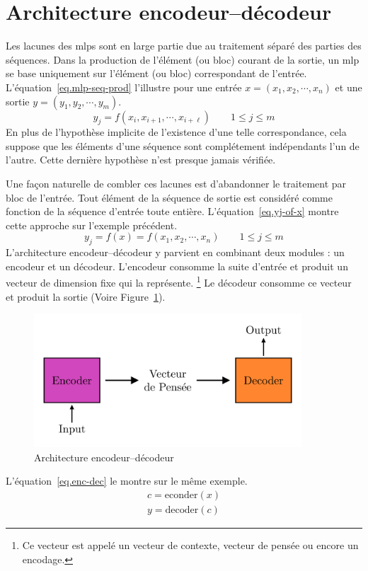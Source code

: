 \section{Architecture encodeur--décodeur}

Les lacunes des \glspl{mlp} sont en large partie due au traitement séparé des parties des séquences.
Dans la production de l'élément (ou bloc) courant de la sortie,
un \gls{mlp} se base uniquement sur l'élément (ou bloc) correspondant de l'entrée.
L'équation~\ref{eq.mlp-seq-prod} l'illustre pour une entrée \(x = (x_1, x_2, \cdots, x_n)\)
et une sortie \(y = (y_1, y_2, \cdots, y_m)\).
\begin{equation}
    \label{eq.mlp-seq-prod}
    y_j = f(x_i, x_{i+1}, \cdots, x_{i+\ell}) \qquad 1 \le j \le m
\end{equation}
En plus de l'hypothèse implicite de l'existence d'une telle correspondance,
cela suppose que les éléments d'une séquence sont complétement indépendants l'un de l'autre.
Cette dernière hypothèse n'est presque jamais vérifiée. 

Une façon naturelle de combler ces lacunes est d'abandonner le traitement par bloc de l'entrée.
Tout élément de la séquence de sortie est considéré comme fonction de la séquence d'entrée toute entière.
L'équation~\ref{eq.yj-of-x} montre cette approche sur l'exemple précédent.  
\begin{equation}
    \label{eq.yj-of-x}
    y_j = f(x) = f(x_1, x_2, \cdots, x_n) \qquad 1 \le j \le m
\end{equation}
L'architecture encodeur--décodeur y parvient en combinant deux modules : un encodeur et un décodeur.
L'encodeur consomme la suite d'entrée et produit un vecteur de dimension fixe qui la représente.
\footnote{Ce vecteur est appelé un vecteur de contexte, vecteur de pensée ou encore un encodage.}
Le décodeur consomme ce vecteur et produit la sortie (Voire Figure~\ref{fig.encoder-decoder}).
\begin{figure}[hbt]
    \centering
    \includegraphics[width=10cm]{assets/images/encoder-decoder.png}
    \caption{Architecture encodeur--décodeur}
    \label{fig.encoder-decoder}
\end{figure}
L'équation~\ref{eq.enc-dec} le montre sur le même exemple.
\begin{equation}
    \label{eq.enc-dec}
    \begin{array}{l}
        c = \mathrm{econder}(x)\\
        y = \mathrm{decoder}(c)
    \end{array}
\end{equation}

